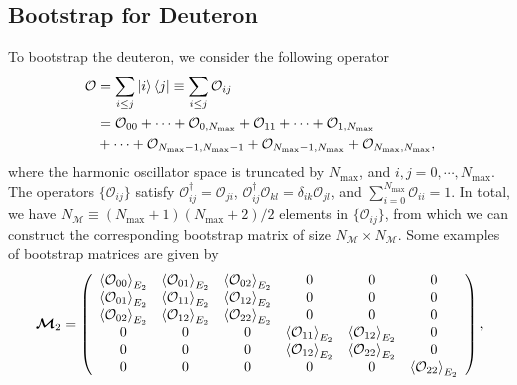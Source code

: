 \documentclass[aps,prc,reprint,superscriptaddress,nofootinbib]{revtex4-2}
\begin{document}
\begin{widetext}

\subsection{Bootstrap for Deuteron}

To bootstrap the deuteron, we consider the following operator
\begin{align}
\mathcal{O}&=\sum_{i\leq j}\ket{i}\bra{j}
\equiv\sum_{i\leq j}\mathcal{O}_{ij}\nonumber\\
&=\mathcal{O}_{00}+\cdots+\mathcal{O}_{0,N_\text{max}}
+\mathcal{O}_{11}+\cdots+\mathcal{O}_{1,N_\text{max}}\nonumber\\
&+\cdots+\mathcal{O}_{N_\text{max}-1,N_\text{max}-1}+\mathcal{O}_{N_\text{max}-1,N_\text{max}}+\mathcal{O}_{N_\text{max},N_\text{max}},\end{align}
where the harmonic oscillator space is truncated by $N_\text{max}$,
and $i,j=0,\cdots,N_\text{max}$.
The operators $\{\mathcal{O}_{ij}\}$ satisfy $\mathcal{O}_{ij}^\dagger=\mathcal{O}_{ji}$, 
$\mathcal{O}_{ij}^\dagger\mathcal{O}_{kl}=\delta_{ik}\mathcal{O}_{jl}$,
and $\sum_{i=0}^{N_\text{max}}\mathcal{O}_{ii}=1$.
In total, we have $N_{\bm{\mathcal{M}}}\equiv (N_\text{max}+1)(N_\text{max}+2)/2$ elements in $\{\mathcal{O}_{ij}\}$,
from which we can construct
the corresponding bootstrap matrix of size $N_{\bm{\mathcal{M}}}\times N_{\bm{\mathcal{M}}}$.
Some examples of bootstrap matrices are given by
\begin{align}
\bm{\mathcal{M}}_2=\left(
\begin{array}{cccccc}
\braket{\mathcal{O}_{00}}_{E_2} & \braket{\mathcal{O}_{01}}_{E_2} & \braket{\mathcal{O}_{02}}_{E_2} & 0 & 0 & 0 \\
\braket{\mathcal{O}_{01}}_{E_2} & \braket{\mathcal{O}_{11}}_{E_2} & \braket{\mathcal{O}_{12}}_{E_2} & 0 & 0 & 0 \\
\braket{\mathcal{O}_{02}}_{E_2} & \braket{\mathcal{O}_{12}}_{E_2} & \braket{\mathcal{O}_{22}}_{E_2} & 0 & 0 & 0 \\
0 & 0 & 0 & \braket{\mathcal{O}_{11}}_{E_2} & \braket{\mathcal{O}_{12}}_{E_2} & 0 \\
0 & 0 & 0 & \braket{\mathcal{O}_{12}}_{E_2} & \braket{\mathcal{O}_{22}}_{E_2} & 0 \\
0 & 0 & 0 & 0 & 0 & \braket{\mathcal{O}_{22}}_{E_2}
\end{array}
\right),
\label{BM3}
\end{align}


\end{widetext}
\end{document}
